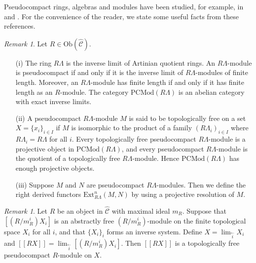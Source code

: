 \documentclass{amsart}
\theoremstyle{plain}
\theoremstyle{definition}
\theoremstyle{remark}
\newtheorem{rem}[thm]{Remark}
\begin{document}
Pseudocompact rings, algebras and modules have been studied, for example, in 
\cite{ga1,ga2} and \cite{brumer}. For the convenience of the reader, we state some useful facts
from these references.

\begin{rem}
\label{rem:pseudocompact}
Let $R \in \mathrm{Ob}(\hat{\mathcal{C}})$.
\begin{enumerate}
\item[(i)] The ring $R\Lambda$ is the inverse limit 
of Artinian quotient rings. 
An $R\Lambda$-module is pseudocompact if and only if it is the inverse limit of 
$R\Lambda$-modules of finite length. 
Moreover, an $R\Lambda$-module has finite length 
if and only if it has finite length as an $R$-module.
The category $\mathrm{PCMod}(R\Lambda)$ is an abelian
category with exact inverse limits. 

\item[(ii)] A pseudocompact $R\Lambda$-module $M$ is said to be topologically free on a set
$X=\{x_i\}_{i\in I}$ if $M$ is isomorphic to the product of a family $(R\Lambda_i)_{i\in I}$ where
$R\Lambda_i=R\Lambda$ for all $i$.
Every topologically free pseudocompact $R\Lambda$-module is a projective object in 
$\mathrm{PCMod}(R\Lambda)$, and every pseudocompact
$R\Lambda$-module is the quotient of a topologically free $R\Lambda$-module. Hence
$\mathrm{PCMod}(R\Lambda)$ has enough projective objects. 

\item[(iii)] Suppose $M$ and $N$ are pseudocompact $R\Lambda$-modules. Then we define the right 
derived functors $\mathrm{Ext}^n_{R\Lambda}(M,N)$ by using a projective resolution of $M$. 
\end{enumerate}
\end{rem}

\begin{rem}
\label{rem:extrafree}
Let $R$ be an object in $\hat{\mathcal{C}}$ with maximal ideal $m_R$. Suppose that 
$[(R/m_R^i)X_i]$ is an abstractly free $(R/m_R^i)$-module on the finite topological space $X_i$
for all $i$,
and that $\{X_i\}_i$ forms an inverse system. Define $X=\displaystyle \lim_{\stackrel{
\longleftarrow}{i}} X_i$ and $[[R X]] = \displaystyle \lim_{\stackrel{\longleftarrow}{i}} 
[(R/m_R^i) X_i]$. Then
$[[R X]]$ is a topologically free pseudocompact $R$-module on $X$. 
\end{rem}
\end{document}

